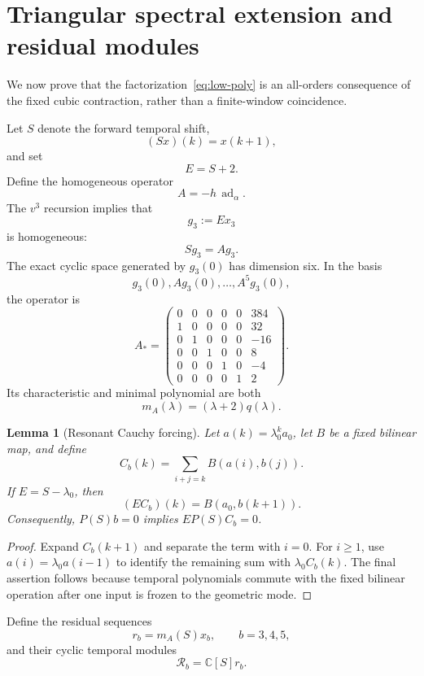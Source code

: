 \documentclass[11pt]{amsart}
\newtheorem{lemma}[theorem]{Lemma}
\newcommand{\C}{\mathbb C}
\begin{document}
\section{Triangular spectral extension and residual modules}\label{sec:spectral-extension}

We now prove that the factorization~\eqref{eq:low-poly} is an all-orders consequence of the fixed cubic contraction, rather than a finite-window coincidence.

Let $S$ denote the forward temporal shift,
\[
(Sx)(k)=x(k+1),
\]
and set
\[
E=S+2.
\]
Define the homogeneous operator
\[
A=-h\,\operatorname{ad}_\alpha.
\]
The $v^3$ recursion implies that
\[
g_3:=Ex_3
\]
is homogeneous:
\[
Sg_3=Ag_3.
\]
The exact cyclic space generated by $g_3(0)$ has dimension six.  In the basis
\[
g_3(0),Ag_3(0),\ldots,A^5g_3(0),
\]
the operator is
\begin{equation}\label{eq:Astar}
A_*=\begin{pmatrix}
0&0&0&0&0&384\\
1&0&0&0&0&32\\
0&1&0&0&0&-16\\
0&0&1&0&0&8\\
0&0&0&1&0&-4\\
0&0&0&0&1&2
\end{pmatrix}.
\end{equation}
Its characteristic and minimal polynomial are both
\begin{equation}\label{eq:mA}
\boxed{m_A(\lambda)=(\lambda+2)q(\lambda).}
\end{equation}

\begin{lemma}[Resonant Cauchy forcing]\label{lem:cauchy-resonance}
Let $a(k)=\lambda_0^ka_0$, let $B$ be a fixed bilinear map, and define
\[
C_b(k)=\sum_{i+j=k}B(a(i),b(j)).
\]
If $E=S-\lambda_0$, then
\[
(EC_b)(k)=B(a_0,b(k+1)).
\]
Consequently, $P(S)b=0$ implies $EP(S)C_b=0$.
\end{lemma}

\begin{proof}
Expand $C_b(k+1)$ and separate the term with $i=0$.  For $i\ge1$, use $a(i)=\lambda_0a(i-1)$ to identify the remaining sum with $\lambda_0C_b(k)$.  The final assertion follows because temporal polynomials commute with the fixed bilinear operation after one input is frozen to the geometric mode.
\end{proof}

Define the residual sequences
\[
r_b=m_A(S)x_b,
\qquad b=3,4,5,
\]
and their cyclic temporal modules
\[
\mathcal R_b=\C[S]r_b.
\]
\end{document}
